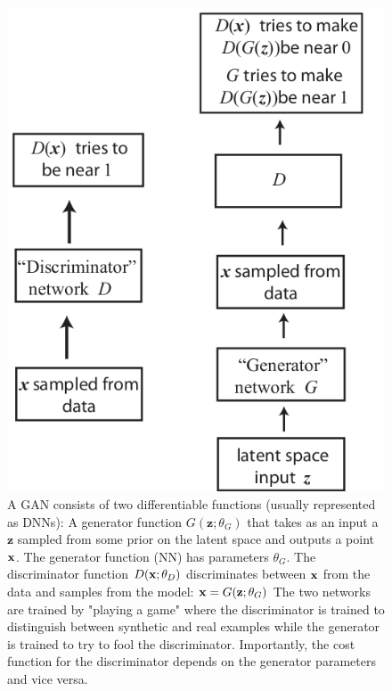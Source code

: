 \begin{figure}[h!]
	\centering
	\includegraphics[width=0.7\linewidth]{gfx/GAN}
	\caption{ A GAN consists of two differentiable functions (usually represented as DNNs): A generator function $G(\mathbf{z};\theta_G)$ that takes as an input a $\mathbf{z}$ sampled from some prior on the latent space and outputs a point $\mathbf{x}$. The generator function (NN) has parameters $\theta_G$. The discriminator function $D(\mathbf{x};\theta_D)$ discriminates between $\mathbf{x}$ from the data and samples from the model: $\mathbf{x} = G(\mathbf{z};\theta_G)$ The two networks are trained by "playing a game" where the discriminator is trained to distinguish between synthetic and real examples while the generator is trained to try to fool the discriminator. Importantly, the cost function for the discriminator depends on the generator parameters and vice versa.}
	\label{fig:gan}
\end{figure}




